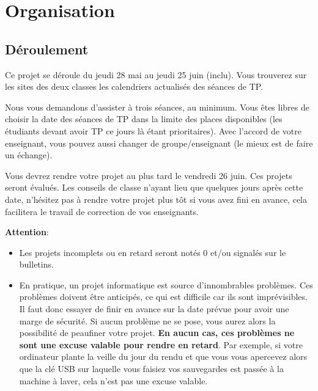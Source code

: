 \section{Organisation}

\subsection{Déroulement}

Ce projet se déroule du jeudi 28 mai au jeudi 25 juin (inclu). Vous trouverez sur les sites des deux 
classes les calendriers actualisés des séances de TP. 


Nous vous demandons d'assister à trois séances, au minimum. 
Vous êtes libres de choisir la date des séances de TP dans la limite des places disponibles (les étudiants devant avoir TP ce jours là étant prioritaires). 
Avec l'accord de votre enseignant, vous pouvez aussi changer de groupe/enseignant (le mieux est de faire un échange). 

Vous devrez rendre votre projet au plus tard le vendredi 26 juin. Ces projets seront évalués. Les conseils de 
classe n'ayant lieu que quelques jours après cette date, n'hésitez pas à rendre votre projet plus tôt si vous avez 
fini en avance, cela facilitera le travail de correction de vos enseignants.


\textbf{Attention}:
\begin{itemize}
\item Les projets incomplets ou en retard seront notés $0$ et/ou signalés sur le bulletins.
\item En  pratique, un  projet informatique est source d'innombrables
  problèmes.   Ces  problèmes  doivent  être  anticipés,  ce  qui  est
  difficile car ils sont imprévisibles.  Il faut donc essayer de finir
  en avance sur  la date prévue pour avoir une  marge de sécurité.  Si
  aucun  problème ne  se  pose,  vous aurez  alors  la possibilité  de
  peaufiner votre  projet.  \textbf{En  aucun cas, ces  problèmes ne  sont une
  excuse  valable  pour  rendre  en retard}.   Par  exemple,  si  votre
  ordinateur  plante la  veille  du jour  du rendu  et  que vous  vous
  apercevez  alors  que la  clé  USB  sur  laquelle vous  faisiez  vos
  sauvegardes est  passée à  la machine  à laver,  cela n'est  pas une
  excuse valable.
\end{itemize}

